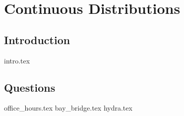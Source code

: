 \documentclass{exam}
\begin{document}
\section{Continuous Distributions}                                                                                                                                          \subsection{Introduction}                                                                                                                                                   
{intro.tex}                                                                                                      \subsection{Questions}                                                                                                                                                      
\begin{questions}                                                                                                                                                           {office_hours.tex}                                                                                               
{bay_bridge.tex}                                                                                                
{hydra.tex}                                                                                                     
\end{questions}                                                                                                                                                             
\end{document}
